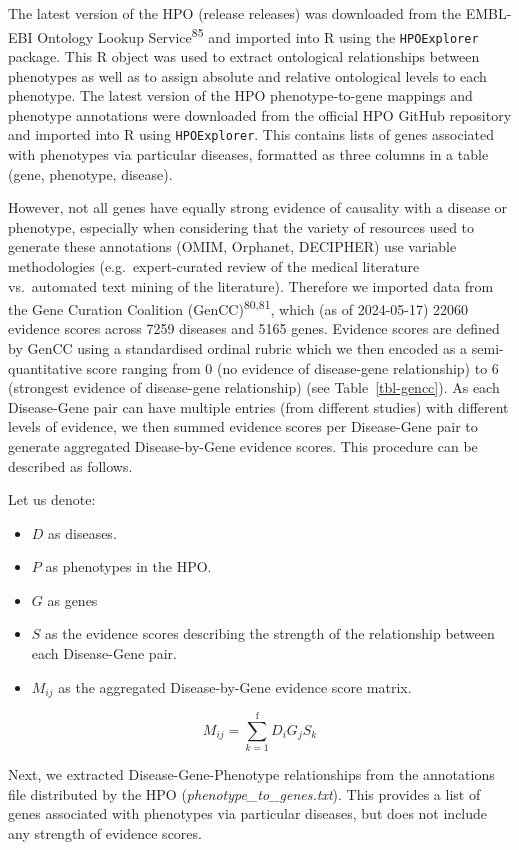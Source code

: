 \documentclass[
]{article}
\begin{document}
The latest version of the HPO (release releases) was downloaded from the
EMBL-EBI Ontology Lookup Service\textsuperscript{85} and imported into R
using the \texttt{HPOExplorer} package. This R object was used to
extract ontological relationships between phenotypes as well as to
assign absolute and relative ontological levels to each phenotype. The
latest version of the HPO phenotype-to-gene mappings and phenotype
annotations were downloaded from the official HPO GitHub repository and
imported into R using \texttt{HPOExplorer}. This contains lists of genes
associated with phenotypes via particular diseases, formatted as three
columns in a table (gene, phenotype, disease).

However, not all genes have equally strong evidence of causality with a
disease or phenotype, especially when considering that the variety of
resources used to generate these annotations (OMIM, Orphanet, DECIPHER)
use variable methodologies (e.g.~expert-curated review of the medical
literature vs.~automated text mining of the literature). Therefore we
imported data from the Gene Curation Coalition
(GenCC)\textsuperscript{80,81}, which (as of 2024-05-17) 22060 evidence
scores across 7259 diseases and 5165 genes. Evidence scores are defined
by GenCC using a standardised ordinal rubric which we then encoded as a
semi-quantitative score ranging from 0 (no evidence of disease-gene
relationship) to 6 (strongest evidence of disease-gene relationship)
(see Table~\ref{tbl-gencc}). As each Disease-Gene pair can have multiple
entries (from different studies) with different levels of evidence, we
then summed evidence scores per Disease-Gene pair to generate aggregated
Disease-by-Gene evidence scores. This procedure can be described as
follows.

Let us denote:

\begin{itemize}
\item
  \(D\) as diseases.
\item
  \(P\) as phenotypes in the HPO.
\item
  \(G\) as genes
\item
  \(S\) as the evidence scores describing the strength of the
  relationship between each Disease-Gene pair.
\item
  \(M_{ij}\) as the aggregated Disease-by-Gene evidence score matrix.
\end{itemize}

\[
M_{ij} = \sum_{k=1}^{\text{f}} D_i G_j S_k
\]

Next, we extracted Disease-Gene-Phenotype relationships from the
annotations file distributed by the HPO
(\emph{phenotype\_to\_genes.txt}). This provides a list of genes
associated with phenotypes via particular diseases, but does not include
any strength of evidence scores.
\end{document}
